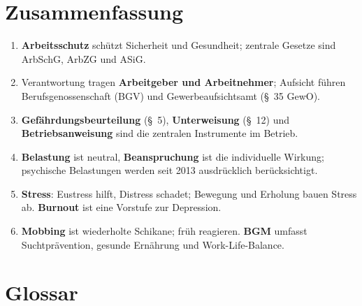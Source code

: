 \documentclass[11pt, a4paper]{article}
\begin{document}
\section{Zusammenfassung}

\begin{enumerate}
  \item \textbf{Arbeitsschutz} schützt Sicherheit und Gesundheit; zentrale Gesetze sind ArbSchG, ArbZG und ASiG.
  \item Verantwortung tragen \textbf{Arbeitgeber und Arbeitnehmer}; Aufsicht führen Berufsgenossenschaft (BGV) und Gewerbeaufsichtsamt (\S~35 GewO).
  \item \textbf{Gefährdungsbeurteilung} (\S~5), \textbf{Unterweisung} (\S~12) und \textbf{Betriebsanweisung} sind die zentralen Instrumente im Betrieb.
  \item \textbf{Belastung} ist neutral, \textbf{Beanspruchung} ist die individuelle Wirkung; psychische Belastungen werden seit 2013 ausdrücklich berücksichtigt.
  \item \textbf{Stress}: Eustress hilft, Distress schadet; Bewegung und Erholung bauen Stress ab. \textbf{Burnout} ist eine Vorstufe zur Depression.
  \item \textbf{Mobbing} ist wiederholte Schikane; früh reagieren. \textbf{BGM} umfasst Suchtprävention, gesunde Ernährung und Work-Life-Balance.
\end{enumerate}

\newpage

\section*{Glossar}




\end{document}

